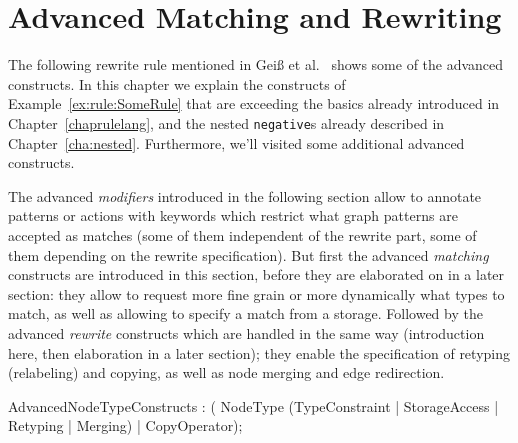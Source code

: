 \chapter{Advanced Matching and Rewriting}
\label{chapadvanced}

The following rewrite rule mentioned in Geiß et al.~\cite{GBGHS:06} shows some of the advanced constructs.
In this chapter we explain the constructs of Example~\ref{ex:rule:SomeRule} that are exceeding the basics already introduced in Chapter~\ref{chaprulelang}, and the nested \texttt{negative}s already described in Chapter~\ref{cha:nested}.
Furthermore, we'll visited some additional advanced constructs.

\begin{example}\label{ex:rule:SomeRule}
\end{example}

The advanced \emph{modifiers} introduced in the following section allow to annotate patterns or actions with keywords which restrict what graph patterns are accepted as matches (some of them independent of the rewrite part, some of them depending on the rewrite specification).
But first the advanced \emph{matching} constructs are introduced in this section, before they are elaborated on in a later section:
they allow to request more fine grain or more dynamically what types to match, as well as allowing to specify a match from a storage.
Followed by the advanced \emph{rewrite} constructs which are handled in the same way (introduction here, then elaboration in a later section);
they enable the specification of retyping (relabeling) and copying, as well as node merging and edge redirection.

\begin{rail}
AdvancedNodeTypeConstructs : ( NodeType (TypeConstraint | StorageAccess | Retyping | Merging) | CopyOperator);
\end{rail}

